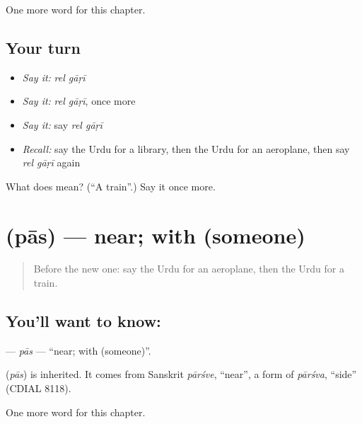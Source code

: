 \begin{grammarlens}[title={What you've built}]
One more word for this chapter.
\end{grammarlens}

\subsection*{Your turn}
\begin{itemize}
\raggedright
  \item \emph{Say it:} \emph{rel gāṛī}
  \item \emph{Say it:} \emph{rel gāṛī}, once more
  \item \emph{Say it:} say \emph{rel gāṛī}
  \item \emph{Recall:} say the Urdu for a library, then the Urdu for an aeroplane, then say \emph{rel gāṛī} again
\end{itemize}

\begin{tcolorbox}[breakable,colback=teal!4,colframe=teal!35!black,title={Before you move on}]
What does   mean? (\textquotedblleft{}A train\textquotedblright{}.) Say it once more.
\end{tcolorbox}
\section[\texorpdfstring{\ur{پاس} (pās)}{پاس (pās)}]{ (pās) — near; with (someone)}

\label{lesson:UR-C103-pas}



\begin{quote}
Before the new one: say the Urdu for an aeroplane, then the Urdu for a train.
\end{quote}

\subsection*{You'll want to know: }
\textbf{} — \emph{pās} — \textquotedblleft{}near; with (someone)\textquotedblright{}.

\begin{cousinweb}
\textbf{} (\emph{pās}) is inherited. It comes from Sanskrit \emph{pārśve}, \textquotedblleft{}near\textquotedblright{}, a form of \emph{pārśva}, \textquotedblleft{}side\textquotedblright{} (CDIAL 8118).
\end{cousinweb}

\begin{grammarlens}[title={What you've built}]
One more word for this chapter.
\end{grammarlens}

